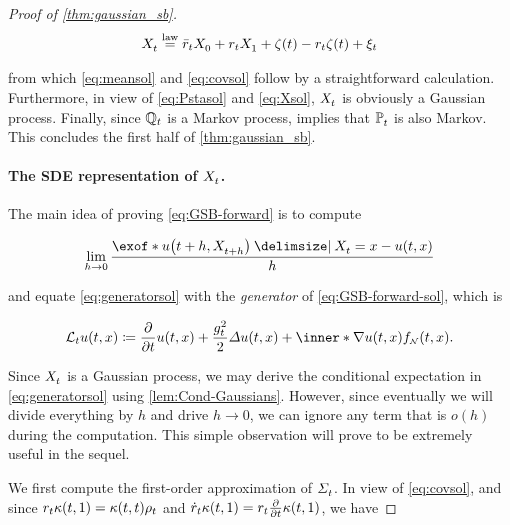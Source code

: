 \begin{proof}[Proof of \cref{thm:gaussian_sb}]
\begin{align}
\label{eq:Xsol}
\Xsol \eqlaw \ratioc \Xsol[0] + \ratio \Xsol[\horizon] + \tshift - \ratio \tshift + \xi_\ctime
\end{align}

from which \eqref{eq:meansol} and \eqref{eq:covsol} follow by a straightforward calculation. Furthermore, in view of \eqref{eq:Pstasol} and \eqref{eq:Xsol}, $X^{}_{ t }$ is obviously a Gaussian process. Finally, since $\mathbb{Q}_{ t }$ is a Markov process, \cite[Theorem 2.12]{leonard2013survey} implies that $\mathbb{P}^{}_{ t }$ is also Markov. This concludes the first half of \cref{thm:gaussian_sb}.


\paragraph{The SDE representation of $X^{}_{ t }$.}
The main idea of proving \eqref{eq:GSB-forward} is to compute

\begin{equation}
\label{eq:generatorsol}
\lim_{ h\to 0}  \frac{  \exof*{ \testf[\ctime+h][\Xsol[\ctime+h]] \given \Xsol = x }  - \testf  }{h}
\end{equation}

and equate \eqref{eq:generatorsol} with the \emph{generator} of \eqref{eq:GSB-forward-sol}, which is \citep{protter2005stochastic}

\begin{equation}
\label{eq:gensde}
\generator \testf \defeq  \frac{\del}{\del \ctime} \testf +  \frac{\volatsq[\ctime]}{2} \Laplace \testf +  \inner*{  \nabla \testf }{ \GSBf }.
\end{equation}

Since $X^{}_{ t }$ is a Gaussian process, we may derive the conditional expectation in \eqref{eq:generatorsol} using \cref{lem:Cond-Gaussians}. However, since eventually we will divide everything by $h$ and drive $h\to 0$, we can ignore any term that is $o(h)$ during the computation. This simple observation will prove to be extremely useful in the sequel.


We first compute the first-order approximation of $\Sigma^{}_{ t }$. In view of \eqref{eq:covsol}, and since $\ratio \kernel[\ctime][\horizon] = \kernel[\ctime][\ctime]\efftr$ and $\dratio\kernel[\ctime][\horizon]=\ratio \frac{\del}{\del \ctime} \kernel[\ctime][\horizon]$, we have


\end{proof}
